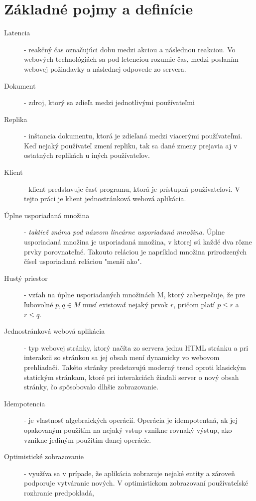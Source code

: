 \chapter{Základné pojmy a definície}

\label{kap:zakladne} %

\begin{description}
\item [Latencia] - reakčný čas označujúci dobu medzi akciou a následnou reakciou. Vo webových 
technológiách sa pod letenciou rozumie čas, medzi poslaním webovej požiadavky a následnej
odpovede zo servera.
\item [Dokument] - zdroj, ktorý sa zdieľa medzi jednotlivými používateľmi
\item [Replika] - inštancia dokumentu, ktorá je zdieľaná medzi viacerými používateľmi. Keď nejaký
používateľ zmení repliku, tak sa dané zmeny prejavia aj v ostatných replikách u iných
používateľov.
\item [Klient] - klient predstavuje časť programu, ktorá je prístupná používateľovi. V tejto práci
je klient jednostránková webová aplikácia.
\item [Úplne usporiadaná množina] - \textit{taktiež známa pod názvom lineárne usporiadaná množina.} 
Úplne usporiadaná množina je usporiadaná množina, v ktorej sú každé dva rôzne prvky porovnateľné. 
Takouto reláciou je napríklad množina prirodzených čísel usporiadaná reláciou "menší ako".
\item [Hustý priestor] - vzťah na úplne usporiadaných množinách M, ktorý zabezpečuje, že pre 
ľubovolné $p, q \in M$ musí existovať nejaký prvok $r$, pričom platí $p \leq r$ a 
$r \leq q$.
\item [Jednostránková webová aplikácia] - typ webovej stránky, ktorý načíta zo servera jednu HTML
stránku a pri interakcii so stránkou sa jej obsah mení dynamicky vo webovom prehliadači. Takéto
stránky predstavujú moderný trend oproti klasickým statickým stránkam, ktoré pri interakciách
žiadali server o nový obsah stránky, čo spôsobovalo dlhšie zobrazovanie.
\item [Idempotencia] - je vlastnosť algebraických operácií. Operácia je idempotentná, ak jej
opakovaným použitím na nejaký vstup vznikne rovnaký výstup, ako vznikne jediným použitím danej
operácie.
\item [Optimistické zobrazovanie] - využíva sa v prípade, že aplikácia zobrazuje nejaké entity a
zároveň podporuje vytváranie nových. V optimistickom zobrazovaní používateľské rozhranie predpokladá,

\end{description}
